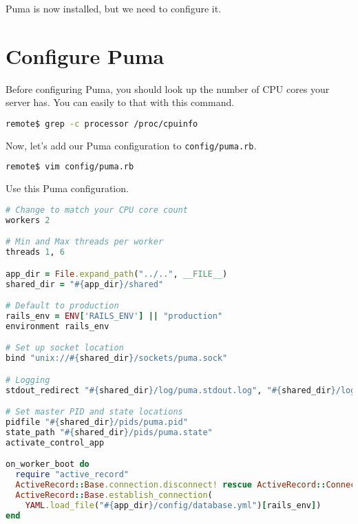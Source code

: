 Puma is now installed, but we need to configure it.

\section{Configure Puma}

Before configuring Puma, you should look up the number of CPU cores
your server has. You can easily to that with this command.

\begin{minipage}{\linewidth}
\begin{lstlisting}[language=bash]
remote$ grep -c processor /proc/cpuinfo
\end{lstlisting}
\end{minipage}

Now, let's add our Puma configuration to \texttt{config/puma.rb}.

\begin{minipage}{\linewidth}
\begin{lstlisting}[language=bash]
remote$ vim config/puma.rb
\end{lstlisting}
\end{minipage}

Use this Puma configuration.

\begin{minipage}{\linewidth}
  \begin{lstlisting}[language=ruby, caption={config/puma.rb}]
# Change to match your CPU core count
workers 2

# Min and Max threads per worker
threads 1, 6

app_dir = File.expand_path("../..", __FILE__)
shared_dir = "#{app_dir}/shared"

# Default to production
rails_env = ENV['RAILS_ENV'] || "production"
environment rails_env

# Set up socket location
bind "unix://#{shared_dir}/sockets/puma.sock"

# Logging
stdout_redirect "#{shared_dir}/log/puma.stdout.log", "#{shared_dir}/log/puma.stderr.log", true

# Set master PID and state locations
pidfile "#{shared_dir}/pids/puma.pid"
state_path "#{shared_dir}/pids/puma.state"
activate_control_app

on_worker_boot do
  require "active_record"
  ActiveRecord::Base.connection.disconnect! rescue ActiveRecord::ConnectionNotEstablished
  ActiveRecord::Base.establish_connection(
    YAML.load_file("#{app_dir}/config/database.yml")[rails_env])
end
\end{lstlisting}
\end{minipage}

